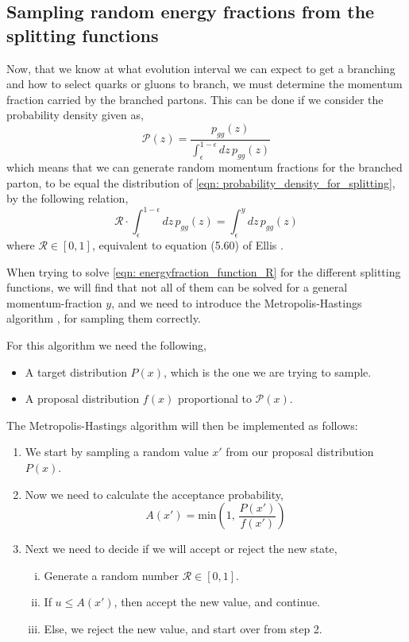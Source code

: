 \documentclass[main.tex]{subfiles}
\begin{document}
\subsection{Sampling random energy fractions from the splitting functions}\label{sec: metropolis_hastings}
Now, that we know at what evolution interval we can expect to get a branching and how to select quarks or gluons to branch, we must determine the momentum fraction carried by the branched partons.
This can be done if we consider the probability density given as,
\begin{equation}\label{eqn: probability_density_for_splitting}
    \mathcal{P}(z) = \frac{ p_{gg}(z)}{\int_\epsilon^{1-\epsilon} dz \, p_{gg}(z)}
\end{equation}
which means that we can generate random momentum fractions for the branched parton, to be equal the distribution of \eqref{eqn: probability_density_for_splitting}, by the following relation,
\begin{equation}\label{eqn: energyfraction_function_R}
    \mathcal{R} \cdot \int_\epsilon^{1-\epsilon} dz \, p_{gg}(z) = \int_\epsilon^{y}dz \, p_{gg}(z)
\end{equation}
where \(\mathcal{R}\in [0,1]\), equivalent to equation (5.60) of Ellis \cite{ellis_stirling_webber_1996}.

When trying to solve \autoref{eqn: energyfraction_function_R} for the different splitting functions, we will find that not all of them can be solved for a general momentum-fraction \(y\), and we need to introduce the Metropolis-Hastings algorithm \cite{enwiki:1048445594}, for sampling them correctly.

For this algorithm we need the following,
\begin{itemize}
    \item A target distribution \(P(x)\), which is the one we are trying to sample.
    \item A proposal distribution \(f(x)\) proportional to \(\mathcal{P}(x)\).
\end{itemize}
The Metropolis-Hastings algorithm will then be implemented as follows:
\begin{enumerate}
    \item We start by sampling a random value \(x'\) from our proposal distribution \(P(x)\).
    \item Now we need to calculate the acceptance probability,
    \[A(x') = \text{min} \left(1, \, \frac{P(x')}{f(x')}\right)\]
    \item Next we need to decide if we will accept or reject the new state,
    \begin{enumerate}[i)]
        \item Generate a random number \(\mathcal{R}\in [0,1]\).
        \item If \(u\leq A(x')\), then accept the new value, and continue.
        \item Else, we reject the new value, and start over from step 2.
    \end{enumerate}
\end{enumerate}
\end{document}
